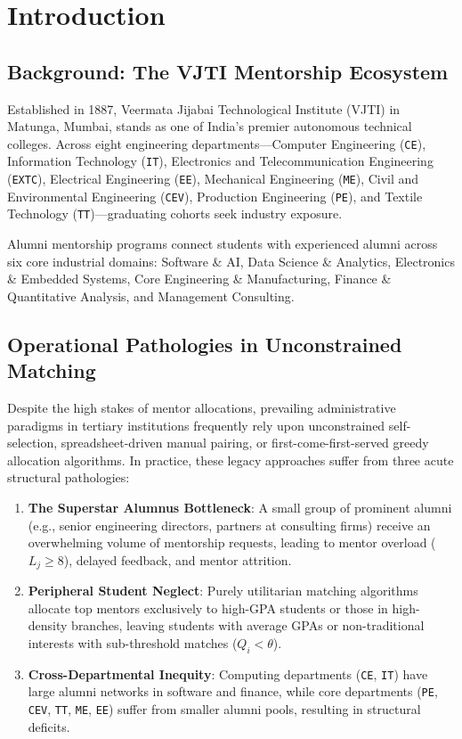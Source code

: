 \documentclass[11pt,a4paper,oneside]{report}
\begin{document}
\chapter{Introduction}

\section{Background: The VJTI Mentorship Ecosystem}
Established in 1887, Veermata Jijabai Technological Institute (VJTI) in Matunga, Mumbai, stands as one of India's premier autonomous technical colleges. Across eight engineering departments—Computer Engineering (\texttt{CE}), Information Technology (\texttt{IT}), Electronics and Telecommunication Engineering (\texttt{EXTC}), Electrical Engineering (\texttt{EE}), Mechanical Engineering (\texttt{ME}), Civil and Environmental Engineering (\texttt{CEV}), Production Engineering (\texttt{PE}), and Textile Technology (\texttt{TT})—graduating cohorts seek industry exposure.

Alumni mentorship programs connect students with experienced alumni across six core industrial domains: Software \& AI, Data Science \& Analytics, Electronics \& Embedded Systems, Core Engineering \& Manufacturing, Finance \& Quantitative Analysis, and Management Consulting.

\section{Operational Pathologies in Unconstrained Matching}
Despite the high stakes of mentor allocations, prevailing administrative paradigms in tertiary institutions frequently rely upon unconstrained self-selection, spreadsheet-driven manual pairing, or first-come-first-served greedy allocation algorithms. In practice, these legacy approaches suffer from three acute structural pathologies:
\begin{enumerate}
    \item \textbf{The Superstar Alumnus Bottleneck}: A small group of prominent alumni (e.g., senior engineering directors, partners at consulting firms) receive an overwhelming volume of mentorship requests, leading to mentor overload ($L_j \ge 8$), delayed feedback, and mentor attrition.
    \item \textbf{Peripheral Student Neglect}: Purely utilitarian matching algorithms allocate top mentors exclusively to high-GPA students or those in high-density branches, leaving students with average GPAs or non-traditional interests with sub-threshold matches ($Q_i < \theta$).
    \item \textbf{Cross-Departmental Inequity}: Computing departments (\texttt{CE}, \texttt{IT}) have large alumni networks in software and finance, while core departments (\texttt{PE}, \texttt{CEV}, \texttt{TT}, \texttt{ME}, \texttt{EE}) suffer from smaller alumni pools, resulting in structural deficits.
\end{enumerate}
\end{document}
